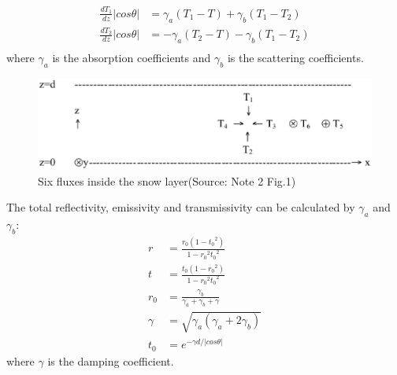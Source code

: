 \begin{equation*}
\begin{split}
    \frac{dT_1}{dz}\vert cos\theta \vert &={\gamma}_a(T_1-T)+\gamma_b(T_1-T_2)\\
    \frac{dT_2}{dz}\vert cos\theta \vert &=-{\gamma}_a(T_2-T)-\gamma_b(T_1-T_2)\\
\end{split}
\end{equation*}
where $\gamma_a$ is the absorption coefficients and $\gamma_b$ is the scattering coefficients. 

\begin{figure}[!hbp]
  \centering
   \includegraphics[scale=0.5]{6flux.eps} 
  \caption{Six fluxes inside the snow layer(Source: Note 2 Fig.1)}
  \label{fig:6flux}
\end{figure}

The total reflectivity, emissivity and transmissivity can be calculated by $\gamma_a$ and $\gamma_b$:
\begin{equation*}
\begin{split}
r&=\frac{r_0(1-{t_0}^2)}{1-{r_0}^2{t_0}^2}\\
t&=\frac{t_0(1-{r_0}^2)}{1-{r_0}^2{t_0}^2}\\
r_0&=\frac{\gamma_b}{\gamma_a+\gamma_b+\gamma}\\
\gamma&=\sqrt{\gamma_a(\gamma_a+2\gamma_b)}\\
t_0&=e^{-{\gamma}d/\vert cos\theta\vert}  
\end{split}  
\end{equation*}
where $\gamma$ is the damping coefficient.

